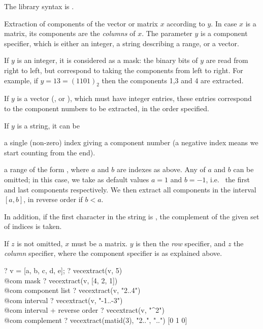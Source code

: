 The library syntax is .

\label{se:vecextract}
Extraction of components of the vector or matrix $x$ according to $y$.
In case $x$ is a matrix, its components are the \emph{columns} of $x$. The
parameter $y$ is a component specifier, which is either an integer, a string
describing a range, or a vector.

If $y$ is an integer, it is considered as a mask: the binary bits of $y$ are
read from right to left, but correspond to taking the components from left to
right. For example, if $y=13=(1101)_2$ then the components 1,3 and 4 are
extracted.

If $y$ is a vector (,  or ), which must have
integer entries, these entries correspond to the component numbers to be
extracted, in the order specified.

If $y$ is a string, it can be

\item a single (non-zero) index giving a component number (a negative
index means we start counting from the end).

\item a range of the form , where $a$ and $b$ are
indexes as above. Any of $a$ and $b$ can be omitted; in this case, we take
as default values $a = 1$ and $b = -1$, i.e.~ the first and last components
respectively. We then extract all components in the interval $[a,b]$, in
reverse order if $b < a$.

In addition, if the first character in the string is \kbd{\pow}, the
complement of the given set of indices is taken.

If $z$ is not omitted, $x$ must be a matrix. $y$ is then the \emph{row}
specifier, and $z$ the \emph{column} specifier, where the component specifier
is as explained above.

\bprog
? v = [a, b, c, d, e];
? vecextract(v, 5)         \\@com mask
? vecextract(v, [4, 2, 1]) \\@com component list
? vecextract(v, "2..4")    \\@com interval
? vecextract(v, "-1..-3")  \\@com interval + reverse order
? vecextract(v, "^2")      \\@com complement
? vecextract(matid(3), "2..", "..")
[0 1 0]

